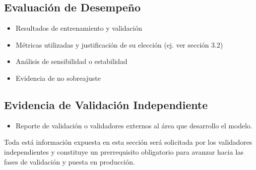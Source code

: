\documentclass[11pt,oneside]{article}%
\begin{document}
\subsection{Evaluación de Desempeño}
\begin{itemize}
\item Resultados de entrenamiento y validación 
\item Métricas utilizadas y justificación de su elección (ej. ver sección 3.2)
\item Análisis de sensibilidad o estabilidad
\item Evidencia de no sobreajuste
\end{itemize}

\subsection{Evidencia de Validación Independiente}

\begin{itemize}
\item Reporte de validación o validadores externos al área que desarrollo el modelo. 
\end{itemize}

Toda está información expuesta en esta sección será solicitada por los validadores independientes y constituye un prerrequisito obligatorio para avanzar hacia las fases de validación y puesta en producción. 
\newpage
\end{document}
